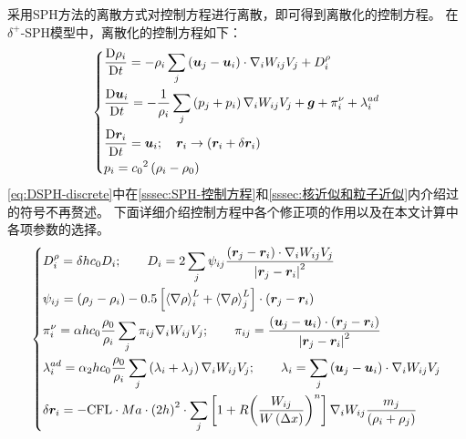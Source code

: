 采用SPH方法的离散方式对控制方程进行离散，即可得到离散化的控制方程。%
在$\delta^+$-SPH模型中，离散化的控制方程如下：
\begin{equation}
  \left\{ 
    \begin{aligned}
      & \frac{{\rm{D}}\rho_i}{{\rm{D}}t} = %
      - \rho_i\sum_j\left( \bm{u}_j-\bm{u}_i \right)\cdot {\nabla_i}W_{ij}V_j+D_i^\rho \\ 
      & \frac{{\rm{D}}\bm{u}_i}{{\rm{D}}t} =%
       - \frac{1}{\rho_i}\sum_j\left(p_j + p_i\right){\nabla_i}W_{ij}V_j+\bm{g}+\pi_i^{\nu }+\lambda_i^{ad} \\ 
      & \frac{{\rm{D}}\bm{r}_i}{{\rm{D}}t} = \bm{u}_i; %
      \quad \bm{r}_i\to \left( \bm{r}_i+\delta \bm{r}_i \right) \\ 
      & p_i = {c_0}^2\left( \rho_i-\rho_0 \right) \\  
    \end{aligned}
  \right.
  \label{eq:DSPH-discrete}
\end{equation}
\cref{eq:DSPH-discrete}中在\cref{sssec:SPH-控制方程}和\cref{sssec:核近似和粒子近似}内介绍过的符号不再赘述。%
下面详细介绍控制方程中各个修正项的作用以及在本文计算中各项参数的选择。
\begin{equation}
  \left\{
    \begin{aligned}
      & D_i^\rho=\delta h{c_0}{{D}_i};%
      \qquad {{D}_i} = 2\sum_j\psi_{ij} %
      \frac{\left( \bm{r}_j-\bm{r}_i \right)\cdot {\nabla_i}W_{ij}V_j}%
      {{{\left| \bm{r}_j-\bm{r}_i \right|}^2}} \\ 
      & \psi_{ij} = \left( \rho_j - \rho_i \right) %
      - 0.5\left[ \left\langle \nabla \rho \right\rangle _i^{L} %
      + \left\langle \nabla \rho \right\rangle _j^{L} \right]\cdot \left( \bm{r}_j-\bm{r}_i \right) \\ 
      & \pi_i^{\nu }=\alpha h{c_0}\frac{\rho_0}{\rho_i}\sum_j\pi_{ij}{\nabla_i}W_{ij}V_j; %
      \qquad {\pi_{ij}}=\frac{\left( \bm{u}_j-\bm{u}_i \right)\cdot \left( \bm{r}_j-\bm{r}_i \right)} %
      {{{\left| \bm{r}_j-\bm{r}_i \right|}^2}} \\ 
      & \lambda_i^{ad} = {{\alpha }_2}h{c_0}\frac{\rho_0}{\rho_i} %
      \sum_j\left( {{\lambda }_i}+{{\lambda }_j} \right){\nabla_i}W_{ij}V_j; %
      \qquad {{\lambda }_i}=\sum_j\left( \bm{u}_j-\bm{u}_i \right)\cdot {\nabla_i}W_{ij}V_j \\ 
      & \delta \bm{r}_i = - {\rm{CFL}}\cdot Ma\cdot {{\left( 2h \right)}^2}\cdot %
      \sum_j\left[ 1+R{{\left( \frac{W_{ij}}{W\left( \Delta x \right)} \right)}^{n}} \right] %
      {\nabla_i}W_{ij}\frac{m_j}{\left( \rho_i+\rho_j \right)}
    \end{aligned}
  \right.
\end{equation}

